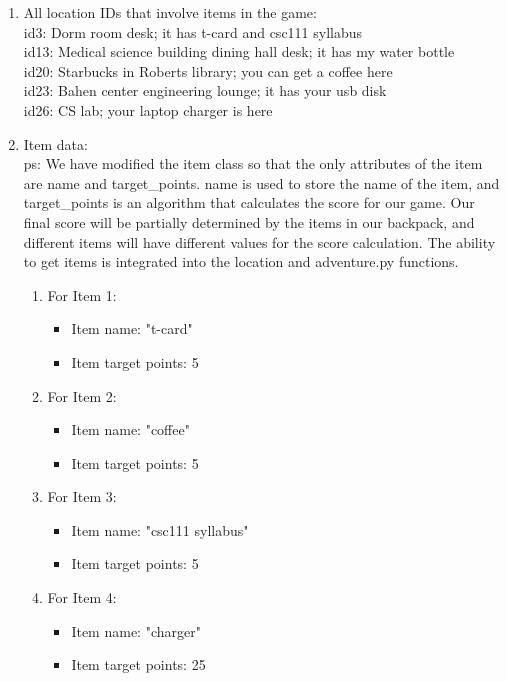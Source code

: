 \documentclass[11pt]{article}
\begin{document}
\begin{enumerate}
\item All location IDs that involve items in the game:\\
id3: Dorm room desk; it has t-card and csc111 syllabus\\
id13: Medical science building dining hall desk; it has my water bottle\\
id20: Starbucks in Roberts library; you can get a coffee here\\
id23: Bahen center engineering lounge; it has your usb disk\\
id26: CS lab; your laptop charger is here\\
\item Item data:\\
ps: We have modified the item class so that the only attributes of the item are name and target\_points. name is used to store the name of the item, and target\_points is an algorithm that calculates the score for our game. Our final score will be partially determined by the items in our backpack, and different items will have different values for the score calculation. The ability to get items is integrated into the location and adventure.py functions.
\begin{enumerate}
    \item For Item 1:
    \begin{itemize}
    \item Item name: "t-card"
    \item Item target points: 5
    \end{itemize}
        \item For Item 2:
    \begin{itemize}
    \item Item name: "coffee"
    \item Item target points: 5
    \end{itemize}
        \item For Item 3:
    \begin{itemize}
    \item Item name: "csc111 syllabus"
    \item Item target points: 5
    \end{itemize}
            \item For Item 4:
    \begin{itemize}
    \item Item name: "charger"
    \item Item target points: 25
    \end{itemize}

\end{enumerate}
\end{enumerate}
\end{document}
